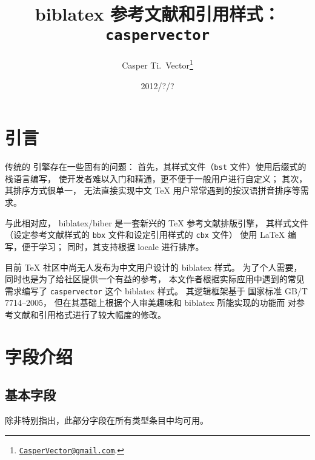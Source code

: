 \documentclass[UTF8, fancyhdr, hyperref]{ctexart}
\begin{document}
\title{\textbf{biblatex 参考文献和引用样式：\texttt{caspervector}}}
\author{%
	Casper Ti.\ Vector\thanks{%
		\href{mailto:CasperVector@gmail.com}{\texttt{CasperVector@gmail.com}}.%
	}%
}
\date{2012/?/?}
\maketitle

\section{引言}

传统的  引擎存在一些固有的问题：
首先，其样式文件（\verb|bst| 文件）使用后缀式的栈语言编写，
使开发者难以入门和精通，更不便于一般用户进行自定义；
其次，其排序方式很单一，
无法直接实现中文 \TeX{} 用户常常遇到的按汉语拼音排序等需求。

与此相对应，
biblatex\supercite{biblatex}/biber\supercite{biber}
是一套新兴的 \TeX{} 参考文献排版引擎，
其样式文件（设定参考文献样式的 \verb|bbx| 文件和设定引用样式的 \verb|cbx| 文件）
使用 \LaTeX{} 编写，便于学习；
同时，其支持根据 locale 进行排序。

目前 \TeX{} 社区中尚无人发布为中文用户设计的 biblatex 样式。
为了个人需要，同时也是为了给社区提供一个有益的参考，
本文作者根据实际应用中遇到的常见需求编写了
\verb|caspervector| 这个 biblatex 样式。
其逻辑框架基于
国家标准 GB/T 7714--2005\supercite{gbt7714-2005}，
但在其基础上根据个人审美趣味和 biblatex 所能实现的功能而
对参考文献和引用格式进行了较大幅度的修改。

\section{字段介绍}
\subsection{基本字段}

除非特别指出，此部分字段在所有类型条目中均可用。
\end{document}
